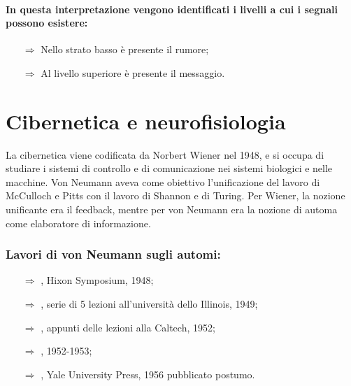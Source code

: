 \paragraph{In questa interpretazione vengono identificati i livelli a cui i segnali possono esistere:}
\begin{itemize}
    \item [$\Rightarrow$] Nello strato basso è presente il rumore;
    \item [$\Rightarrow$] Al livello superiore è presente il messaggio.
\end{itemize}

\section{Cibernetica e neurofisiologia}

La cibernetica viene codificata da Norbert Wiener nel 1948, e si occupa di studiare i sistemi di controllo e di comunicazione nei sistemi biologici 
e nelle macchine.
Von Neumann aveva come obiettivo l'unificazione del lavoro di McCulloch e Pitts con il lavoro di Shannon e di Turing. Per Wiener,
la nozione unificante era il feedback, mentre per von Neumann era la nozione di automa come
elaboratore di informazione.

\subsubsection{Lavori di von Neumann sugli automi:}

\begin{itemize}
    \item [$\Rightarrow$] , Hixon Symposium, 1948;
    \item [$\Rightarrow$] , serie di 5 lezioni all'università dello Illinois, 1949;
    \item [$\Rightarrow$] , appunti delle lezioni alla Caltech, 1952;
    \item [$\Rightarrow$] , 1952-1953;
    \item [$\Rightarrow$] , Yale University Press, 1956 pubblicato postumo.
\end{itemize}

\subsubsection{}

